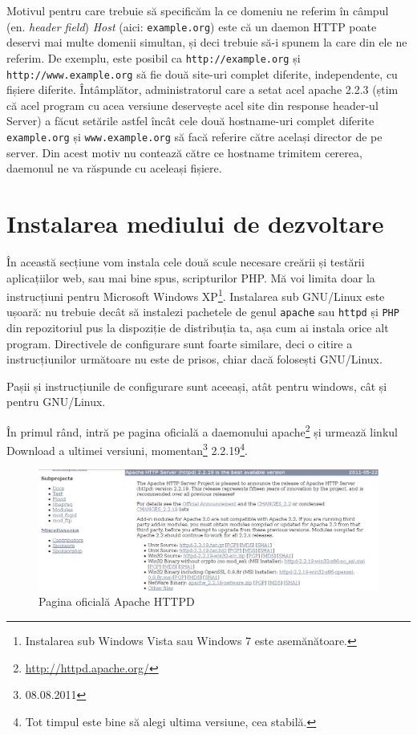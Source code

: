 Motivul pentru care trebuie să specificăm la ce domeniu ne referim în câmpul
(en. \textsl{header field}) \textsl{Host} (aici: \texttt{example.org}) este că un daemon HTTP
poate deservi mai multe domenii simultan, și deci trebuie să-i spunem la care
din ele ne referim.
De exemplu, este posibil ca \texttt{http://example.org} și
\texttt{http://www.example.org} să fie două site-uri complet diferite, independente, cu
fișiere diferite. Întâmplător, administratorul care a setat acel apache 2.2.3 (știm că
acel program cu acea versiune deservește acel site din response header-ul {\glqq}Server{\grqq}) a făcut setările astfel
încât cele două hostname-uri complet diferite \texttt{example.org} și \texttt{www.example.org}
să facă referire către același director de pe server. Din acest motiv nu contează
către ce hostname trimitem cererea, daemonul ne va răspunde cu aceleași fișiere.

\section{Instalarea mediului de dezvoltare}
În această secțiune vom instala cele două scule necesare creării și testării
aplicațiilor web, sau mai bine spus, scripturilor PHP. Mă voi limita doar
la instrucțiuni pentru Microsoft Windows XP\footnote{Instalarea sub Windows Vista sau 
Windows 7 este asemănătoare.}. Instalarea sub GNU/Linux este ușoară: nu trebuie
decât să instalezi pachetele de genul \texttt{apache} sau \texttt{httpd}
și \texttt{PHP} din repozitoriul
pus la dispoziție de distribuția ta, așa cum ai instala orice alt program.
Directivele de configurare sunt foarte similare, deci o citire a instrucțiunilor
următoare nu este de prisos, chiar dacă folosești GNU/Linux.

Pașii și instrucțiunile de configurare sunt aceeași,
atât pentru windows, cât și pentru GNU/Linux.

În primul rând, intră pe pagina oficială a daemonului
apache\footnote{\url{http://httpd.apache.org/}} și urmează linkul
Download a ultimei versiuni, momentan\footnote{08.08.2011} 2.2.19\footnote{Tot
timpul este bine să alegi ultima versiune, cea stabilă.}.


\begin{figure}[ht!]
  \centering
    \includegraphics[width=400bp]{cap01/Screenshot.png}
  \caption{Pagina oficială Apache HTTPD}
  \label{fig:httpd homepage}
\end{figure}


